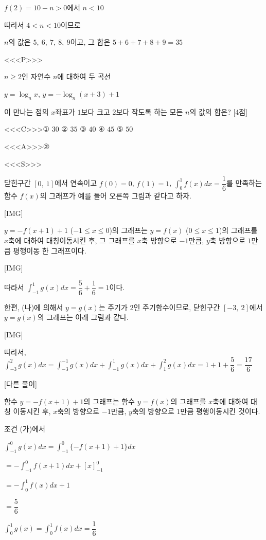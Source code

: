 \documentclass{oblivoir}
\begin{document}
$f(2)=10-n>0$에서 $n< 10$

따라서 $4< n< 10$이므로

$n$의 값은 $5,\:6,\:7,\:8,\:9$이고, 그 합은 $5+6+7+8+9=35$

<<<P>>>

$n\ge 2$인 자연수 $n$에 대하여 두 곡선

$y=\log_{n}x$, $y= -\log_{n}(x+3)+1$

이 만나는 점의 $x$좌표가 $1$보다 크고 $2$보다 작도록 하는 모든 $n$의 값의 합은? [4점]

<<<C>>>① $30$ ② $35$ ③ $40$ ④ $45$ ⑤ $50$

<<<A>>>②

<<<S>>>

닫힌구간 $[0,\:1]$에서 연속이고 $f(0)=0$, $f(1)=1$, $\displaystyle\int_{0}^{1}f(x)dx =\dfrac{1}{6}$를 만족하는 함수 $f(x)$의 그래프가 예를 들어 오른쪽 그림과 같다고 하자.

[IMG]

$y=-f(x+1)+1$ ($-1\le x\le 0$)의 그래프는 $y=f(x)$ ($0\le x\le 1$)의 그래프를 $x$축에 대하여 대칭이동시킨 후, 그 그래프를 $x$축 방향으로 $-1$만큼, $y$축 방향으로 $1$만큼 평행이동 한 그래프이다. 

[IMG]

따라서 $\displaystyle\int_{-1}^{1}g(x)dx=\dfrac{5}{6}+\dfrac{1}{6}=1$이다.

한편, (나)에 의해서 $y=g(x)$는 주기가 $2$인 주기함수이므로, 닫힌구간 $[-3,\: 2]$에서 $y=g(x)$의 그래프는 아래 그림과 같다.

[IMG]

따라서, $\displaystyle\int_{-3}^{2}g(x)dx =\displaystyle\int_{-3}^{-1}g(x)dx +\displaystyle\int_{-1}^{1}g(x)dx +\displaystyle\int_{1}^{2}g(x)dx=1+1+\dfrac{5}{6}=\dfrac{17}{6}$

[다른 풀이]

함수 $y=-f(x+1)+1$의 그래프는 함수 $y=f(x)$의 그래프를 $x$축에 대하여 대칭 이동시킨 후, $x$축의 방향으로 $-1$만큼, $y$축의 방향으로 $1$만큼 평행이동시킨 것이다.

조건 (가)에서

$\displaystyle\int_{-1}^{0}g(x)dx$$=\displaystyle\int_{-1}^{0}\{-f(x+1)+1\}dx$

$=-\displaystyle\int_{-1}^{0}f(x+1)dx +[x]_{-1}^{0}$

$=-\displaystyle\int_{0}^{1}f(x)dx +1$

$=\dfrac{5}{6}$

$\displaystyle\int_{0}^{1}g(x)$$=\displaystyle\int_{0}^{1}f(x)dx$$=\dfrac{1}{6}$
\end{document}
